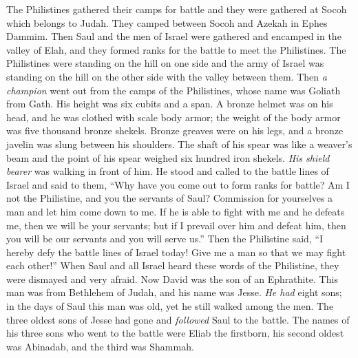 \begin{biblechapter} %
 The Philistines gathered their camps for battle and they were gathered at Socoh which belongs to Judah. They camped between Socoh and Azekah in Ephes Dammim.
\verse Then Saul and the men of Israel were gathered and encamped in the valley of Elah, and they formed ranks for the battle to meet the Philistines.
\verse The Philistines were standing on the hill on one side and the army of Israel was standing on the hill on the other side with the valley between them.
\verse Then \textit{a champion} went out from the camps of the Philistines, whose name was Goliath from Gath. His height was six cubits and a span.
\verse A bronze helmet was on his head, and he was clothed with scale body armor; the weight of the body armor was five thousand bronze shekels.
\verse Bronze greaves were on his legs, and a bronze javelin was slung between his shoulders.
\verse The shaft of his spear was like a weaver’s beam and the point of his spear weighed six hundred iron shekels. \textit{His shield bearer} was walking in front of him.
\verse He stood and called to the battle lines of Israel and said to them, “Why have you come out to form ranks for battle? Am I not the Philistine, and you the servants of Saul? Commission for yourselves a man and let him come down to me.
\verse If he is able to fight with me and he defeats me, then we will be your servants; but if I prevail over him and defeat him, then you will be our servants and you will serve us.”
\verse Then the Philistine said, “I hereby defy the battle lines of Israel today! Give me a man so that we may fight each other!”
\verse When Saul and all Israel heard these words of the Philistine, they were dismayed and very afraid.
 Now David was the son of an Ephrathite. This man was from Bethlehem of Judah, and his name was Jesse. \textit{He had} eight sons; in the days of Saul this man was old, yet he still walked among the men.
\verse The three oldest sons of Jesse had gone and \textit{followed} Saul to the battle. The names of his three sons who went to the battle were Eliab the firstborn, his second oldest was Abinadab, and the third was Shammah.

\end{biblechapter}
